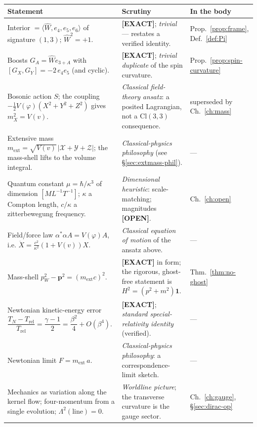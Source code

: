 \documentclass[11pt,oneside]{book}
\newcommand{\Wh}{\hat{W}}                         %
\newcommand{\Cl}{\mathrm{Cl}}                     %
\newcommand{\status}[1]{{\sffamily\bfseries\color{statuscol}[#1]}}
\theoremstyle{plain}
\theoremstyle{definition}
\theoremstyle{remark}
\begin{document}
{\small
\begin{longtable}{@{}p{} p{} p{}@{}}
\toprule
\textbf{Statement} & \textbf{Scrutiny} & \textbf{In the body}\\
\midrule
\endhead
Interior $=\langle\Wh,e_4,e_5,e_6\rangle$ of signature $(1,3)$; $\Wh^2=+1$.
 & \status{EXACT}; \emph{trivial} --- restates a verified identity.
 & Prop.~\ref{prop:frame}, Def.~\ref{def:Pi}\\[2pt]
Boosts $G_A=\Wh e_{3+A}$ with $[G_X,G_Y]=-2\,e_4e_5$ (and cyclic).
 & \status{EXACT}; \emph{trivial duplicate} of the spin curvature.
 & Prop.~\ref{prop:spin-curvature}\\[2pt]
Bosonic action $S$; the coupling $-\tfrac12 V(\varphi)(X^2{+}Y^2{+}Z^2)$ gives $m_X^2=V(v)$.
 & \emph{Classical field-theory ansatz}: a posited Lagrangian, not a $\Cl(3,3)$ consequence.
 & superseded by Ch.~\ref{ch:mass}\\[2pt]
Extensive mass $m_{\mathrm{ext}}=\sqrt{V(v)}\,\lvert\mathcal X{+}\mathcal Y{+}\mathcal Z\rvert$;
 the mass-shell lifts to the volume integral.
 & \emph{Classical-physics philosophy} (see \S\ref{sec:extmass-phil}).
 & ---\\[2pt]
Quantum constant $\mu=\hbar/\kappa^3$ of dimension $[ML^{-1}T^{-1}]$; $\kappa$ a Compton
 length, $c/\kappa$ a zitterbewegung frequency.
 & \emph{Dimensional heuristic}: scale-matching; magnitudes \status{OPEN}.
 & Ch.~\ref{ch:open}\\[2pt]
Field/force law $\alpha^*\alpha A=V(\varphi)A$, i.e. $\ddot X=\tfrac{c^2}{\kappa^2}(1{+}V(v))X$.
 & \emph{Classical equation of motion} of the ansatz above.
 & ---\\[2pt]
Mass-shell $p_W^2-\mathbf p^2=(m_{\mathrm{ext}}c)^2$.
 & \status{EXACT} in form; the rigorous, ghost-free statement is $H^2=(p^2{+}m^2)\mathbf 1$.
 & Thm.~\ref{thm:no-ghost}\\[2pt]
Newtonian kinetic-energy error
 $\dfrac{T_N-T_{\mathrm{rel}}}{T_{\mathrm{rel}}}=\dfrac{\gamma-1}{2}=\dfrac{\beta^2}{4}+O(\beta^4)$.
 & \status{EXACT}; \emph{standard special-relativity identity} (verified).
 & ---\\[2pt]
Newtonian limit $F=m_{\mathrm{ext}}\,a$.
 & \emph{Classical-physics philosophy}: a correspondence-limit sketch.
 & ---\\[2pt]
Mechanics as variation along the kernel flow; four-momentum from a single evolution;
 $\Lambda^2(\text{line})=0$.
 & \emph{Worldline picture}; the transverse curvature is the gauge sector.
 & Ch.~\ref{ch:gauge}, \S\ref{sec:dirac-op}\\[2pt]

\end{longtable}}
\end{document}
